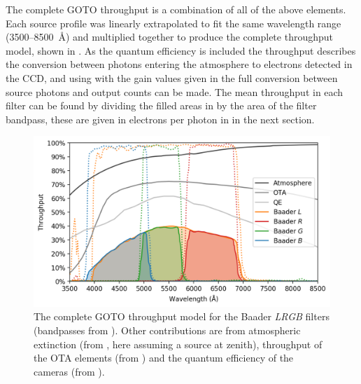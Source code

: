 \begin{colsection}
\begin{colsection}
The complete GOTO throughput is a combination of all of the above elements. Each source profile was linearly extrapolated to fit the same wavelength range (3500--\SI{8500}{\angstrom}) and multiplied together to produce the complete throughput model, shown in . As the quantum efficiency is included the throughput describes the conversion between photons entering the atmosphere to electrons detected in the CCD, and using with the gain values given in  the full conversion between source photons and output counts can be made. The mean throughput in each filter can be found by dividing the filled areas in  by the area of the filter bandpass, these are given in electrons per photon in  in the next section.

\begin{figure}[t]
    \begin{center}
        \includegraphics[width=\textwidth]{images/throughput/throughput.png}
    \end{center}
    \caption[Complete throughput model for the GOTO filters]{
        The complete GOTO throughput model for the Baader \textit{LRGB} filters (bandpasses from ). Other contributions are from atmospheric extinction (from , here assuming a source at zenith), throughput of the OTA elements (from ) and the quantum efficiency of the cameras (from ).
    }\label{fig:throughput}
\end{figure}

\end{colsection}


\end{colsection}

